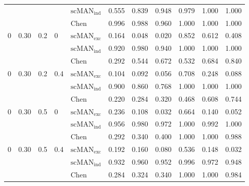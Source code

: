 \begin{table}[H]
\begin{tabular}{lllllllllll}
 &  &  &  & $\mathrm{scMAN}_{\mathrm{ind}}$ & 0.555 & 0.839 & 0.948 & 0.979 & 1.000 & 1.000 \\
 &  &  &  & Chen & 0.996 & 0.988 & 0.960 & 1.000 & 1.000 & 1.000 \\
0 & 0.30 & 0.2 & 0 & $\mathrm{scMAN}_{\mathrm{exc}}$ & 0.164 & 0.048 & 0.020 & 0.852 & 0.612 & 0.408 \\
 &  &  &  & $\mathrm{scMAN}_{\mathrm{ind}}$ & 0.920 & 0.980 & 0.940 & 1.000 & 1.000 & 1.000 \\
 &  &  &  & Chen & 0.292 & 0.544 & 0.672 & 0.532 & 0.684 & 0.840 \\
0 & 0.30 & 0.2 & 0.4 & $\mathrm{scMAN}_{\mathrm{exc}}$ & 0.104 & 0.092 & 0.056 & 0.708 & 0.248 & 0.088 \\
 &  &  &  & $\mathrm{scMAN}_{\mathrm{ind}}$ & 0.900 & 0.860 & 0.768 & 1.000 & 1.000 & 1.000 \\
 &  &  &  & Chen & 0.220 & 0.284 & 0.320 & 0.468 & 0.608 & 0.744 \\
0 & 0.30 & 0.5 & 0 & $\mathrm{scMAN}_{\mathrm{exc}}$ & 0.236 & 0.108 & 0.032 & 0.664 & 0.140 & 0.052 \\
 &  &  &  & $\mathrm{scMAN}_{\mathrm{ind}}$ & 0.956 & 0.980 & 0.972 & 1.000 & 0.992 & 1.000 \\
 &  &  &  & Chen & 0.292 & 0.340 & 0.400 & 1.000 & 1.000 & 0.988 \\
0 & 0.30 & 0.5 & 0.4 & $\mathrm{scMAN}_{\mathrm{exc}}$ & 0.192 & 0.160 & 0.080 & 0.536 & 0.148 & 0.032 \\
 &  &  &  & $\mathrm{scMAN}_{\mathrm{ind}}$ & 0.932 & 0.960 & 0.952 & 0.996 & 0.972 & 0.948 \\
 &  &  &  & Chen & 0.284 & 0.324 & 0.340 & 1.000 & 1.000 & 0.984 \\
\hline
\end{tabular}
\end{table}
